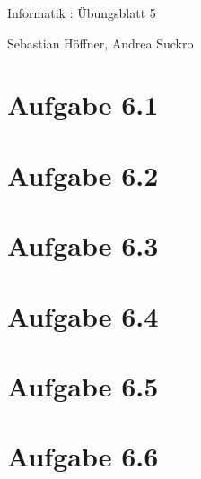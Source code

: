 \documentclass{article}
\begin{document}
\begin{center}
  \Large{Informatik \revD: Übungsblatt 5}

  \large{Sebastian Höffner, Andrea Suckro}
\end{center}



\section*{Aufgabe 6.1}



\section*{Aufgabe 6.2}



\section*{Aufgabe 6.3}



\section*{Aufgabe 6.4}



\section*{Aufgabe 6.5}



\section*{Aufgabe 6.6}
\end{document}
